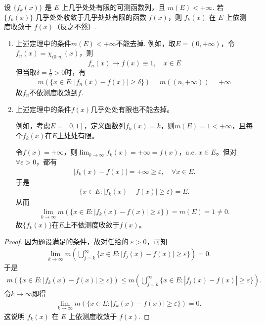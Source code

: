 \documentclass[../../main.tex]{subfiles}%
\begin{document}
\begin{theorem}[Lebesgue定理]\label{theorem:几乎处处收敛在E的测度有限前提下必依测度收敛}
设 $\{f_k(x)\}$ 是 $E$ 上几乎处处有限的可测函数列，且 $m(E)<+\infty$. 若 $\{f_k(x)\}$ 几乎处处收敛于几乎处处有限的函数 $f(x)$，则 $f_k(x)$ 在 $E$ 上依测度收敛于 $f(x)$（反之不然）.
\end{theorem}
\begin{remark}
\begin{enumerate}
\item 上述定理中的条件\(m(E) < +\infty\)不能去掉. 例如，取\(E = (0, +\infty)\)，令\(f_n(x) = \chi_{(0,n]}(x)\)，则
\[f_n(x) \to f(x) \equiv 1, \quad x \in E\]
但当取\(\delta = \frac{1}{2} > 0\)时，有
\begin{align*}
m(\{x \in E : |f_n(x) - f(x)| \geqslant \delta\}) = m((n, +\infty)) = +\infty
\end{align*}
故\(f_n\)不依测度收敛到\(f\). 

\item 上述定理中的条件\(f(x)\)几乎处处有限也不能去掉。

例如，考虑\(E = [0, 1]\)，定义函数列\(f_k(x) = k\)，则\(m(E) = 1 < +\infty\)，且每个\(f_k(x)\)在\(E\)上处处有限。

令\(f(x) = +\infty\)，则\(\lim_{k \to \infty} f_k(x) = +\infty = f(x)\)，a.e. \(x \in E\)。但对\(\forall \varepsilon > 0\)，都有
\begin{align*}
|f_k(x) - f(x)| = +\infty \geqslant \varepsilon, \quad \forall x \in E.
\end{align*}
于是
\begin{align*}
\{x \in E : |f_k(x) - f(x)| \geqslant \varepsilon\} = E.
\end{align*}
从而
\begin{align*}
\lim_{k \to \infty} m(\{x \in E : |f_k(x) - f(x)| \geqslant \varepsilon\}) = m(E) = 1 \ne 0.
\end{align*}
故\(\{f_k(x)\}\)在\(E\)上不依测度收敛于\(f(x)\)。
\end{enumerate}
\end{remark}
\begin{proof}
因为题设满足的条件，故对任给的 $\varepsilon>0$，可知
\begin{align*}
\lim_{k\to\infty}m\left(\bigcup_{j = k}^{\infty}\{x\in E:\vert f_j(x)-f(x)\vert\geqslant\varepsilon\}\right)=0.
\end{align*}
于是
\begin{align*}
m(\{x\in E:\left| f_k(x)-f(x) \right|\geqslant \varepsilon \})\leqslant m\left( \bigcup_{j=k}^{\infty}{\{x}\in E:\left| f_j(x)-f(x) \right|\geqslant \varepsilon \} \right) .
\end{align*}
令$k\to \infty$即得
\begin{align*}
\lim_{k\to\infty}m(\{x\in E:\vert f_k(x)-f(x)\vert\geqslant\varepsilon\}) = 0.
\end{align*}
这说明 $f_k(x)$ 在 $E$ 上依测度收敛于 $f(x)$.
\end{proof}
\end{document}
